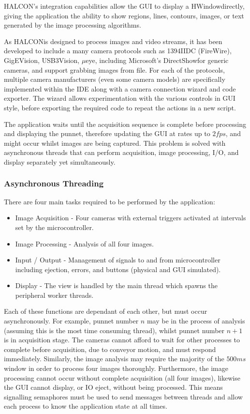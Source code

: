 \documentclass[fleqn,twoside,12pt]{report}
\begin{document}
  
HALCON\texttrademark's integration capabilities allow the GUI to display a HWindow\texttrademark directly, giving the application the ability to show regions, lines, contours, images, or text generated by the image processing algorithms. 

As HALCON\texttrademark is designed to process images and video streams, it has been developed to include a many camera protocols such as 1394IIDC (FireWire\texttrademark), GigEVision\textregistered, USB3Vision\textregistered, $\mu$eye\texttrademark, including Microsoft\textregistered's DirectShow\textregistered for generic cameras, and support grabbing images from file. For each of the protocols, multiple camera manufacturers (even some camera models) are specifically implemented within the IDE along with a camera connection wizard and code exporter. The wizard allows experimentation with the various controls in GUI style, before exporting the required code to repeat the actions in a new script. 

The application waits until the acquisition sequence is complete before processing and displaying the punnet, therefore updating the GUI at rates up to $2fps$, and might occur whilst images are being captured. This problem is solved with asynchronous threads that can perform acquisition, image processing, I/O, and display separately yet simultaneously.


\subsubsection{Asynchronous Threading}

There are four main tasks required to be performed by the application:


\begin{itemize}
	\item Image Acquisition - Four cameras with external triggers activated at intervals set by the microcontroller.
	\item Image Processing - Analysis of all four images.
	\item Input / Output - Management of signals to and from microcontroller including ejection, errors, and buttons (physical and GUI simulated).
	\item Display - The view is handled by the main thread which spawns the peripheral worker threads.
\end{itemize}


Each of these functions are dependant of each other, but must occur asynchronously. For example, punnet number $n$ may be in the process of analysis (assuming this is the most time consuming thread), whilst punnet number $n+1$ is in acquisition stage. The cameras cannot afford to wait for other processes to complete before acquisition, due to conveyor motion, and must respond immediately. Similarly, the image analysis may require the majority of the $500ms$ window in order to process four images thoroughly. Furthermore, the image processing cannot occur without complete acquisition (all four images), likewise the GUI cannot display, or IO eject, without being processed. This means signalling semaphores must be used to send messages between threads and allow each process to know the application state at all times.
\end{document}
